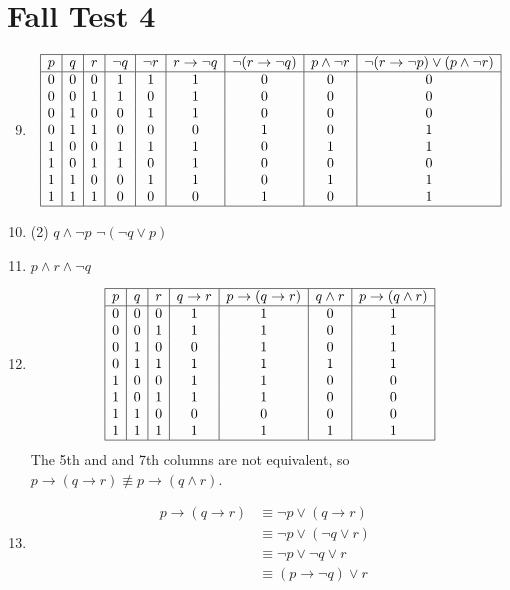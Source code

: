 \documentclass[12pt]{article}
\newcommand{\enumset}[1]{\setcounter{enumi}{#1}}
\begin{document}
	\section{Fall Test 4}
		\begin{enumerate}
			\enumset{8}
			\item
				\[\begin{array}{|*{9}{c|}}\hline
					p & q & r& \lnot q & \lnot r & r \to \lnot q & \lnot(r \to \lnot q) & p \land \lnot r & \lnot(r \to \lnot p) \lor (p \land \lnot r) \\\hline
					0 & 0 & 0 & 1 & 1 & 1 & 0 & 0 & 0 \\
					0 & 0 & 1 & 1 & 0 & 1 & 0 & 0 & 0 \\
					0 & 1 & 0 & 0 & 1 & 1 & 0 & 0 & 0 \\
					0 & 1 & 1 & 0 & 0 & 0 & 1 & 0 & 1 \\
					1 & 0 & 0 & 1 & 1 & 1 & 0 & 1 & 1 \\
					1 & 0 & 1 & 1 & 0 & 1 & 0 & 0 & 0 \\
					1 & 1 & 0 & 0 & 1 & 1 & 0 & 1 & 1 \\
					1 & 1 & 1 & 0 & 0 & 0 & 1 & 0 & 1 \\\hline
				\end{array}\]
			\item
				\begin{tasks}(2)
					\task
						\(q \land \lnot p\)	
					\task
						\(\lnot(\lnot q \lor p)\)
				\end{tasks}
			\item
				\(p \land r \land \lnot q\)
			\item
				\[\begin{array}{|*{8}{c|}}\hline
					p & q & r & q \to r & p \to (q \to r)  & q \land r & p \to (q \land r)\\\hline
					0 & 0 & 0 & 1 & 1 & 0 & 1 \\
					0 & 0 & 1 & 1 & 1 & 0 & 1 \\
					0 & 1 & 0 & 0 & 1 & 0 & 1 \\
					0 & 1 & 1 & 1 & 1 & 1 & 1 \\
					1 & 0 & 0 & 1 & 1 & 0 & 0 \\
					1 & 0 & 1 & 1 & 1 & 0 & 0 \\
					1 & 1 & 0 & 0 & 0 & 0 & 0 \\
					1 & 1 & 1 & 1 & 1 & 1 & 1 \\\hline
				\end{array}\]
				The 5th and and 7th columns are not equivalent, so \(p \to (q \to r) \not\equiv p \to (q \land r)\).
			\item
				\begin{align}
					p \to (q \to r) &\equiv \lnot p \lor (q \to r) \tag{definition of \(\to\)} \\
						&\equiv \lnot p \lor (\lnot q \lor r) &\tag{definition of \(\to\)} \\
						&\equiv \lnot p \lor \lnot q \lor r & \tag{associativity of \(\lor\)} \\
						&\equiv (p \to \lnot q) \lor r \tag{}
				\end{align}

		\end{enumerate}
\end{document}
